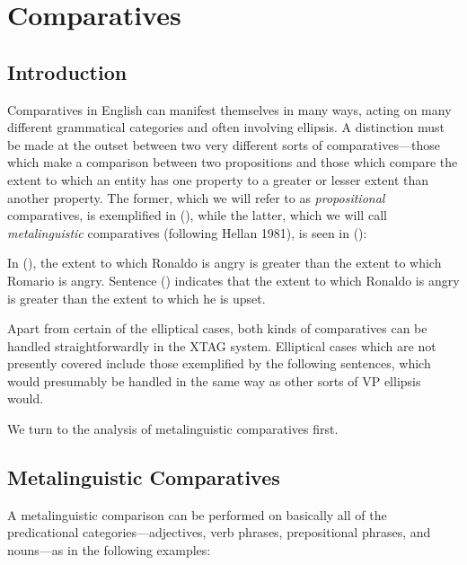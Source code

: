 \chapter{Comparatives}
\label{compars-chapter}

\section{Introduction}

Comparatives in English can manifest themselves in many ways, acting
on many different grammatical categories and often involving ellipsis.
A distinction must be made at the outset between two very different
sorts of comparatives---those which make a comparison between two
propositions and those which compare the extent to which an entity has
one property to a greater or lesser extent than another property.  The
former, which we will refer to as {\it propositional} comparatives, is
exemplified in (), while the latter, which we will call {\it
metalinguistic} comparatives (following Hellan 1981), is seen in
():


\noindent In (), the extent to which Ronaldo is angry is greater
than the extent to which Romario is angry.  Sentence ()
indicates that the extent to which Ronaldo is angry is greater than
the extent to which he is upset.

Apart from certain of the elliptical cases, both kinds of comparatives
can be handled straightforwardly in the XTAG system.  Elliptical cases
which are not presently covered include those exemplified by the
following sentences, which would presumably be handled in the same way
as other sorts of VP ellipsis would.


We turn to the analysis of metalinguistic comparatives first.

\section{Metalinguistic Comparatives}

A metalinguistic comparison can be performed on basically all of the
predicational categories---adjectives, verb phrases, prepositional
phrases, and nouns---as in the following examples:

